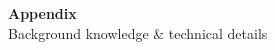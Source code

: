 \documentclass[10pt, aspectratio=169]{beamer}
\begin{document}
\appendix

\begin{frame}[plain]
    \centering
    \vspace{1.5cm}
    {\Huge \textbf{\textcolor{usthblue}{Appendix}}}\\[0.6cm]
    {\Large \textcolor{usthdark}{Background knowledge \& technical details}}\\[1cm]
    \\[0.5cm]
\end{frame}
\end{document}
